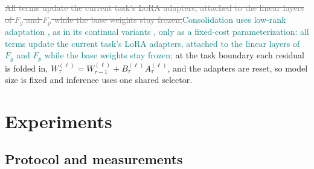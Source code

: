 \documentclass{article}
\newif\ifmarkup \markuptrue
\newcommand{\repc}[3]{\ifmarkup\textcolor{gray}{\sout{#2}}\textcolor{#1}{#3}\else#3\fi}
\newcommand{\repG}[2]{\repc{teal}{#1}{#2}}    %
\newcommand{\Fg}{F_g}
\newcommand{\Fp}{F_p}
\begin{document}
\repG{All terms update the current task's LoRA adapters, attached to the linear layers of $\Fg$ and $\Fp$ while the base weights stay frozen;}{Consolidation uses low-rank adaptation \cite{hu2022lora}, as in its continual variants \cite{liang2024inflora,wu2025sdlora,he2025cllora,chen2026flexem}, only as a fixed-cost parameterization: all terms update the current task's LoRA adapters, attached to the linear layers of $\Fg$ and $\Fp$ while the base weights stay frozen;} at the task boundary each residual is folded in, $W^{(\ell)}_{\tau}=W^{(\ell)}_{\tau-1}+B^{(\ell)}_\tau A^{(\ell)}_\tau$, and the adapters are reset, so model size is fixed and inference uses one shared selector.

\section{Experiments}
\label{sec:exp}

\subsection{Protocol and measurements}
\end{document}
